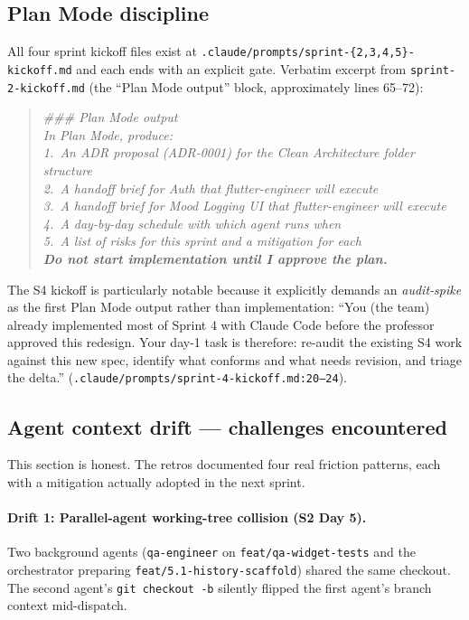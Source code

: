 \documentclass[11pt,a4paper]{article}
\begin{document}
\subsection{Plan Mode discipline}

All four sprint kickoff files exist at
\texttt{.claude/prompts/sprint-\{2,3,4,5\}-kickoff.md} and each ends with
an explicit gate. Verbatim excerpt from \texttt{sprint-2-kickoff.md} (the
``Plan Mode output'' block, approximately lines 65--72):

\begin{quote}\itshape
\#\#\# Plan Mode output\\
In Plan Mode, produce:\\
1.\ An ADR proposal (ADR-0001) for the Clean Architecture folder structure\\
2.\ A handoff brief for Auth that flutter-engineer will execute\\
3.\ A handoff brief for Mood Logging UI that flutter-engineer will execute\\
4.\ A day-by-day schedule with which agent runs when\\
5.\ A list of risks for this sprint and a mitigation for each\\[0.4em]
\textbf{Do not start implementation until I approve the plan.}
\end{quote}

The S4 kickoff is particularly notable because it explicitly demands an
\emph{audit-spike} as the first Plan Mode output rather than
implementation: ``You (the team) already implemented most of Sprint 4
with Claude Code before the professor approved this redesign. Your
day-1 task is therefore: re-audit the existing S4 work against this
new spec, identify what conforms and what needs revision, and triage
the delta.'' (\texttt{.claude/prompts/sprint-4-kickoff.md:20--24}).

\subsection{Agent context drift --- challenges encountered}\label{sec:drift}

This section is honest. The retros documented four real friction
patterns, each with a mitigation actually adopted in the next sprint.

\paragraph{Drift 1: Parallel-agent working-tree collision (S2 Day 5).}
Two background agents (\texttt{qa-engineer} on
\texttt{feat/qa-widget-tests} and the orchestrator preparing
\texttt{feat/5.1-history-scaffold}) shared the same checkout. The second
agent's \texttt{git checkout -b} silently flipped the first agent's
branch context mid-dispatch.
\end{document}
